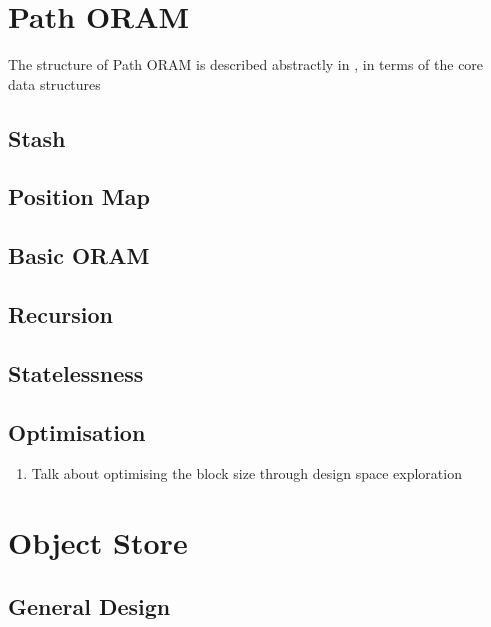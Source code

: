 \documentclass[12pt,a4paper,twoside,openright]{report}
\begin{document}

\section{Path ORAM}
\label{sec:pathORAM}

The structure of Path ORAM is described abstractly in \cite{stefanov2013path}, in terms of the core data structures

\subsection{Stash}



\subsection{Position Map}

\subsection{Basic ORAM}

\subsection{Recursion}

\subsection{Statelessness}

\subsection{Optimisation}

\begin{enumerate}
	\item Talk about optimising the block size through design space exploration
\end{enumerate}

\section{Object Store}
\label{sec:objectStore}

\subsection{General Design}
\end{document}
